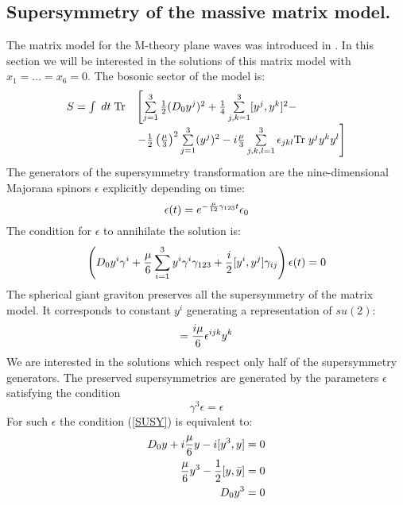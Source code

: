 \documentclass[a4paper,12pt]{article}
\begin{document}
\subsection{Supersymmetry of the massive matrix model.}
The matrix model for the M-theory plane waves was introduced
in \cite{BMN}. In this section we will be interested in the solutions
of this matrix model with $x_1=\ldots=x_6=0$. The bosonic sector
of the model is:
\begin{equation}
\begin{array}{rl}
S=\int\; dt\;\mbox{Tr}&\left[\sum\limits_{j=1}^3
{1\over 2} (D_0 y^j)^2+{1\over 4}\sum\limits_{j,k=1}^3
[y^j,y^k]^2
-\right.\\[5pt] &\left.-
{1\over 2}\left({\mu\over 3}\right)^2
\sum\limits_{j=1}^3 (y^j)^2-i{\mu\over 3}\sum\limits_{j,k,l=1}^3
\epsilon_{jkl}\mbox{Tr}\;y^j y^k y^l\right]
\end{array}
\end{equation}
The generators of the supersymmetry transformation are the
nine-dimensional Majorana spinors $\epsilon$
explicitly depending on time:
\begin{equation}
\epsilon(t)=e^{-{\mu\over 12}\gamma_{123} t}\epsilon_0
\end{equation}
The condition for $\epsilon$ to annihilate the solution is:
\begin{equation}\label{SUSY}
\left(D_0 y^i\gamma^i +
      {\mu\over 6} \sum_{i=1}^3 y^i\gamma^i\gamma_{123}
     +{i\over 2}[y^i,y^j]\gamma_{ij}\right)\epsilon(t)=0
\end{equation}
The spherical giant graviton preserves all the supersymmetry of
the matrix model. It corresponds to constant $y^i$ generating a representation
of $su(2)$:
\begin{equation}
[y^i,y^j]={i\mu\over 6} \epsilon^{ijk} y^k\label{Spherical}
\end{equation}
We are interested in the solutions which respect only half
of the supersymmetry generators. The preserved supersymmetries
are generated by the parameters $\epsilon$ satisfying the condition
\begin{equation}
\gamma^3\epsilon=\epsilon
\end{equation}
For such $\epsilon$ the condition (\ref{SUSY}) is equivalent to:
\begin{eqnarray}\label{MatrixEq}
D_0 y + i{\mu\over 6} y - i[y^3,y]=0\\
{\mu\over 6} y^3 - {1\over 2} [y,\bar{y}]=0\\
D_0 y^3=0
\end{eqnarray}
\end{document}
